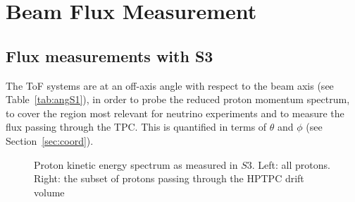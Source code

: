 \section{Beam Flux Measurement}
\label{hptpcPaper:sec:Results}

\subsection{Flux measurements with S3}

The ToF systems are at an off-axis angle with respect to the beam axis (see Table~\ref{tab:angS1}), in order to probe the reduced proton momentum spectrum, to cover the region most relevant for neutrino experiments and to measure the flux passing through the TPC.
This is quantified in terms of $\theta$ and $\phi$ (see Section~\ref{sec:coord}).

\begin{figure}[ht]
  \centering
  \begin{minipage}[t]{0.49\textwidth}
    \begin{adjustbox}{max totalsize={\textwidth}, center}
      
    \end{adjustbox}
  \end{minipage}
  \hfill
  \begin{minipage}[t]{0.49\textwidth}
    \begin{adjustbox}{max totalsize={\textwidth}, center}
      
    \end{adjustbox}
  \end{minipage}
  \caption{\label{fig:s3proke}Proton kinetic energy spectrum as measured in $\mathit{S3}$. Left: all protons. Right: the subset of protons passing through the HPTPC drift volume}
\end{figure}

%      

